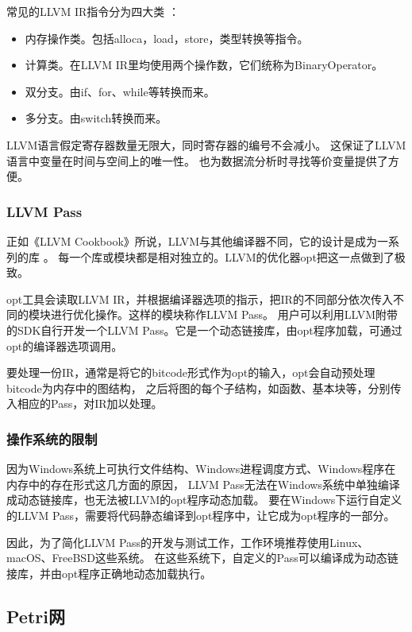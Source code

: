 常见的LLVM IR指令分为四大类 \cite{llvminstdef}：

{
\begin{itemize}
    \addtolength{\itemindent}{2.5em}
    \item 内存操作类。包括alloca，load，store，类型转换等指令。
    \item 计算类。在LLVM IR里均使用两个操作数，它们统称为BinaryOperator。
    \item 双分支。由if、for、while等转换而来。
    \item 多分支。由switch转换而来。
\end{itemize}
}

LLVM语言假定寄存器数量无限大，同时寄存器的编号不会减小。
这保证了LLVM语言中变量在时间与空间上的唯一性。
也为数据流分析时寻找等价变量提供了方便。



\subsubsection{LLVM Pass}
正如《LLVM Cookbook》所说，LLVM与其他编译器不同，它的设计是成为一系列的库 \cite{llvmcook}。
每一个库或模块都是相对独立的。LLVM的优化器opt把这一点做到了极致。

opt工具会读取LLVM IR，并根据编译器选项的指示，把IR的不同部分依次传入不同的模块进行优化操作。这样的模块称作LLVM Pass。
用户可以利用LLVM附带的SDK自行开发一个LLVM Pass。它是一个动态链接库，由opt程序加载，可通过opt的编译器选项调用。

要处理一份IR，通常是将它的bitcode形式作为opt的输入，opt会自动预处理bitcode为内存中的图结构，
之后将图的每个子结构，如函数、基本块等，分别传入相应的Pass，对IR加以处理。

\subsubsection{操作系统的限制}
因为Windows系统上可执行文件结构、Windows进程调度方式、Windows程序在内存中的存在形式这几方面的原因，
LLVM Pass无法在Windows系统中单独编译成动态链接库，也无法被LLVM的opt程序动态加载。
要在Windows下运行自定义的LLVM Pass，需要将代码静态编译到opt程序中，让它成为opt程序的一部分。

因此，为了简化LLVM Pass的开发与测试工作，工作环境推荐使用Linux、macOS、FreeBSD这些系统。
在这些系统下，自定义的Pass可以编译成为动态链接库，并由opt程序正确地动态加载执行。






\subsection{Petri网}

